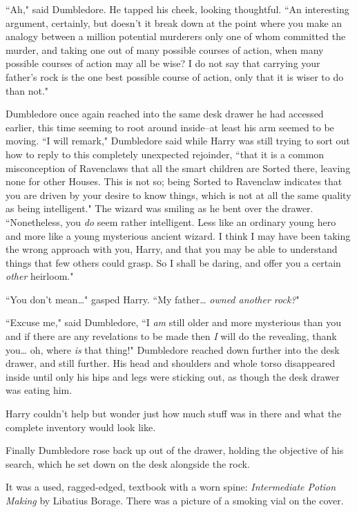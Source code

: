 ``Ah," said Dumbledore. He tapped his cheek, looking thoughtful. ``An interesting argument, certainly, but doesn't it break down at the point where you make an analogy between a million potential murderers only one of whom committed the murder, and taking one out of many possible courses of action, when many possible courses of action may all be wise? I do not say that carrying your father's rock is the one best possible course of action, only that it is wiser to do than not."

Dumbledore once again reached into the same desk drawer he had accessed earlier, this time seeming to root around inside\---at least his arm seemed to be moving. ``I will remark," Dumbledore said while Harry was still trying to sort out how to reply to this completely unexpected rejoinder, ``that it is a common misconception of Ravenclaws that all the smart children are Sorted there, leaving none for other Houses. This is not so; being Sorted to Ravenclaw indicates that you are driven by your desire to know things, which is not at all the same quality as being intelligent." The wizard was smiling as he bent over the drawer. ``Nonetheless, you \emph{do} seem rather intelligent. Less like an ordinary young hero and more like a young mysterious ancient wizard. I think I may have been taking the wrong approach with you, Harry, and that you may be able to understand things that few others could grasp. So I shall be daring, and offer you a certain \emph{other} heirloom."

``You don't mean{\ldots}" gasped Harry. ``My father{\ldots} \emph{owned another rock?}"

``Excuse me," said Dumbledore, ``I \emph{am} still older and more mysterious than you and if there are any revelations to be made then \emph{I} will do the revealing, thank you{\ldots} oh, where \emph{is} that thing!" Dumbledore reached down further into the desk drawer, and still further. His head and shoulders and whole torso disappeared inside until only his hips and legs were sticking out, as though the desk drawer was eating him.

Harry couldn't help but wonder just how much stuff was in there and what the complete inventory would look like.

Finally Dumbledore rose back up out of the drawer, holding the objective of his search, which he set down on the desk alongside the rock.

It was a used, ragged-edged, textbook with a worn spine: \emph{Intermediate Potion Making} by Libatius Borage. There was a picture of a smoking vial on the cover.

